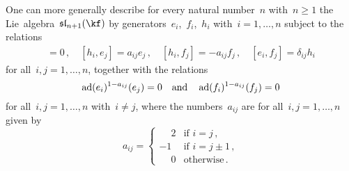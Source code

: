 \begin{remark}
	One can more generally describe for every natural number~$n$ with~$n \geq 1$ the Lie~algebra~$\sllie_{n+1}(\kf)$ by generators~$e_i$,~$f_i$,~$h_i$ with~$i = 1, \dotsc, n$ subject to the relations
	\begin{align*}
		[h_i, h_j] = 0  \,,
		\quad
		[h_i, e_j] = a_{ij} e_j \,,
		\quad
		[h_i, f_j] = -a_{ij}f_j  \,,
		\quad
		[e_i, f_j] = \delta_{ij} h_i
	\end{align*}
	for all~$i,j = 1, \dotsc, n$, together with the relations
	\[
		\operatorname{ad}(e_i)^{1-a_{ij}}(e_j) = 0
		\quad\text{and}\quad
		\operatorname{ad}(f_i)^{1-a_{ij}}(f_j) = 0
	\]
	for all~$i, j = 1, \dotsc, n$ with~$i \neq j$, where the numbers~$a_{ij}$ are for all~$i,j = 1, \dotsc, n$ given by
	\[
		a_{ij} =
		\begin{cases}
		\phantom{-}2 & \text{if $i = j$}  \,, \\
							-1 & \text{if $i = j \pm 1$}  \,, \\
		\phantom{-}0 & \text{otherwise} \,.
		\end{cases}
	\]
\end{remark}


